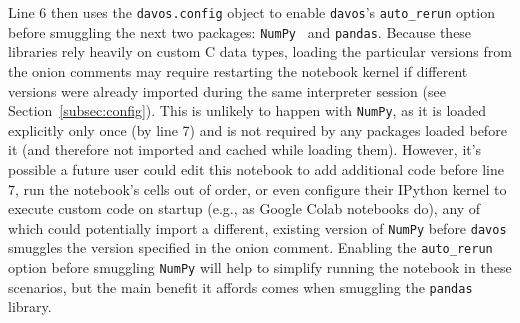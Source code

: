 \documentclass[preprint,12pt,a4paper]{elsarticle}
\begin{document}
Line 6 then uses the \texttt{davos.config} object to enable \texttt{davos}'s \texttt{auto\_rerun} option before smuggling the next two packages: \texttt{NumPy}~\cite{HarrEtal20} and \texttt{pandas}. Because these libraries rely heavily on custom C data types, loading the particular versions from the onion comments may require restarting the notebook kernel if different versions were already imported during the same interpreter session (see Section~\ref{subsec:config}). This is unlikely to happen with \texttt{NumPy}, as it is loaded explicitly only once (by line 7) and is not required by any packages loaded before it (and therefore not imported and cached while loading them). However, it's possible a future user could edit this notebook to add additional code before line 7, run the notebook's cells out of order, or even configure their IPython kernel to execute custom code on startup (e.g., as Google Colab notebooks do), any of which could potentially import a different, existing version of \texttt{NumPy} before \texttt{davos} smuggles the version specified in the onion comment. Enabling the \texttt{auto\_rerun} option before smuggling \texttt{NumPy} will help to simplify running the notebook in these scenarios, but the main benefit it affords comes when smuggling the \texttt{pandas} library.
\end{document}
